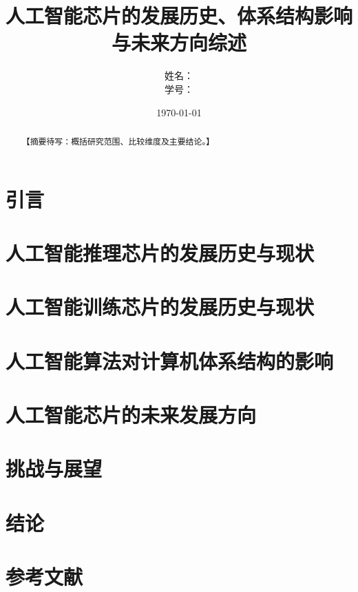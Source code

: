 \documentclass[UTF8,a4paper,12pt]{ctexart}
\title{人工智能芯片的发展历史、体系结构影响与未来方向综述}
\author{姓名：\underline{\hspace{4cm}}\\学号：\underline{\hspace{4cm}}}\date{\today}
\begin{document}
\maketitle
\begin{abstract}【摘要待写：概括研究范围、比较维度及主要结论。】\end{abstract}
\tableofcontents
\section{引言}
\section{人工智能推理芯片的发展历史与现状}
\section{人工智能训练芯片的发展历史与现状}
\section{人工智能算法对计算机体系结构的影响}
\section{人工智能芯片的未来发展方向}
\section{挑战与展望}
\section{结论}
\section*{参考文献}
\end{document}
